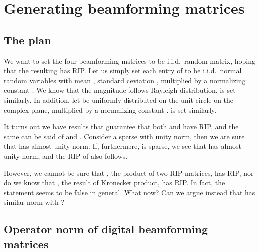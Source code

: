 \section {Generating beamforming matrices}

\subsection {The plan}

We want to set the four beamforming matrices to be i.i.d.\ random matrix, hoping that the resulting  has RIP.
Let us simply set each entry of  to be i.i.d.\ normal random variables with mean , standard deviation , multiplied by a normalizing constant .
We know that the magnitude  follows Rayleigh distribution.
 is set similarly.
In addition, let  be uniformly distributed on the unit circle on the complex plane, multiplied by a normalizing constant .
 is set similarly.

It turns out we have results that guarantee that both  and  have RIP, and the same can be said of  and .
Consider a sparse  with unity norm, then we are sure that  has almost unity norm.
If, furthermore,  is sparse, we see that  has almost unity norm, and the RIP of  also follows.

However, we cannot be sure that , the product of two RIP matrices, has RIP, nor do we know that , the result of Kronecker product, has RIP.
In fact, the statement seems to be false in general.
What now?
Can we argue instead that  has similar norm with ?

\subsection {Operator norm of digital beamforming matrices}

